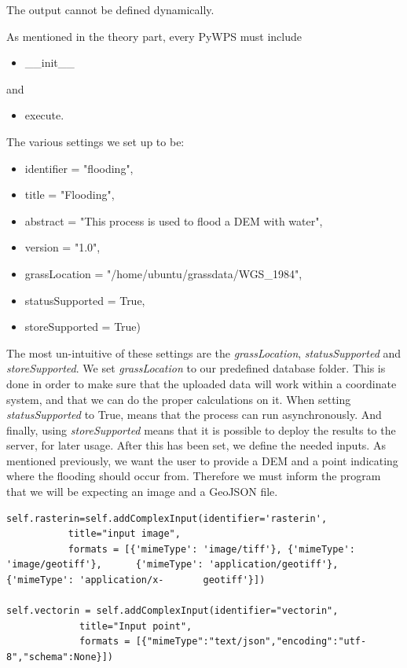 The output cannot be defined dynamically. 

As mentioned in the theory part, every PyWPS must include 
\begin{itemize}
\item \_\_init\_\_ 
\end{itemize}
and 
\begin{itemize}
\item execute.
\end{itemize}
  
The various settings we set up to be:

\begin{itemize}
\item identifier = "flooding",
\item title = "Flooding",
\item abstract = "This process is used to flood a DEM with water",
\item version = "1.0",
\item grassLocation = "/home/ubuntu/grassdata/WGS_1984",
\item statusSupported = True,
\item storeSupported = True)
\end{itemize}

The most un-intuitive of these settings are the \textit{grassLocation}, \textit{statusSupported} and \textit{storeSupported}. 
We set \textit{grassLocation} to our predefined database folder. This is done in order to make sure that the uploaded data will work within a coordinate system, and that we can do the proper calculations on it.
When setting \textit{statusSupported} to True, means that the process can run asynchronously. 
And finally, using \textit{storeSupported} means that it is possible to deploy the results to the server, for later usage. 
After this has been set, we define the needed inputs. As mentioned previously, we want the user to provide a DEM and a point indicating where the flooding should occur from. Therefore we must inform the program that we will be expecting an image and a GeoJSON file. 

\begin{lstlisting}
self.rasterin=self.addComplexInput(identifier='rasterin',
		   title="input image",
	   	   formats = [{'mimeType': 'image/tiff'}, {'mimeType': 			             	'image/geotiff'}, 	   {'mimeType': 'application/geotiff'}, 		            {'mimeType': 'application/x-	   geotiff'}])
	   	   
self.vectorin = self.addComplexInput(identifier="vectorin",
		     title="Input point",
		     formats = [{"mimeType":"text/json","encoding":"utf-			              8","schema":None}])

\end{lstlisting}

